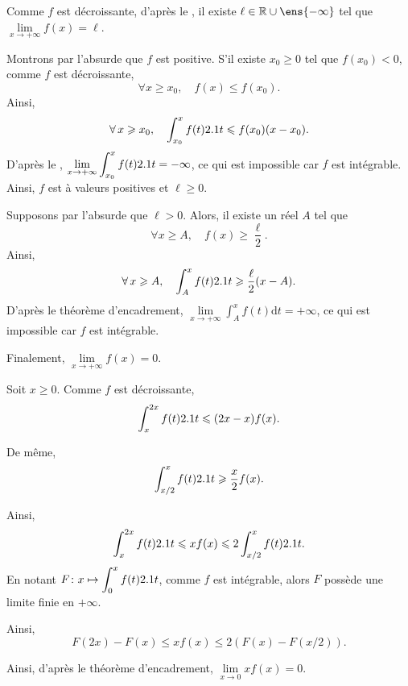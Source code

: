 \begin{elemsolution}
\begin{reponses}
\item Comme $f$ est décroissante, d'après le , il existe $\ell \in \R \cup \ens{-\infty}$ tel que $\lim\limits_{x\to+\infty} f(x) = \ell$.

\item Montrons par l'absurde que $f$ est positive. S'il existe $x_0 \geqslant 0$ tel que $f(x_0) < 0$, comme $f$ est décroissante,
\[
\forall x \geqslant x_0,\quad f(x) \leqslant f(x_0).
\]
Ainsi,
\[
\forall x \geqslant x_0,\quad \displaystyle\int_{x_0}^x f(t) \d t \leqslant f(x_0) (x - x_0).
\]
D'après le , $\lim\limits_{x\to+\infty} \displaystyle\int_{x_0}^x f(t) \d t = -\infty$, ce qui est impossible car $f$ est intégrable. Ainsi, $f$ est à valeurs positives et $\ell \geqslant 0$.

\begin{marginfigure}[0cm]
    \centering
    
    \caption{}
\end{marginfigure}

\item Supposons par l'absurde que $\ell > 0$. Alors, il existe un réel $A$ tel que
\[
\forall x \geqslant A,\quad f(x) \geqslant \frac{\ell}{2}.
\]
Ainsi,
\[
\forall x \geqslant A,\quad \displaystyle\int_A^x f(t) \d t \geqslant \frac{\ell}{2} (x - A).
\]
D'après le théorème d'encadrement, $\lim\limits_{x\to+\infty} \displaystyle\int_A^x f(t) \mathrm{d}t = +\infty$, ce qui est impossible car $f$ est intégrable.

Finalement, $\lim\limits_{x\to+\infty} f(x) = 0$.

\item Soit $x \geqslant 0$. Comme $f$ est décroissante,
\[
\int_x^{2 x} f(t) \d t \leqslant (2 x - x) f(x).
\]

De même,
\[
\int_{x/2}^x f(t) \d t \geqslant \frac{x}{2} f(x).
\]

\begin{marginfigure}
    \centering
    
    \caption{}
\end{marginfigure}

Ainsi,
\[
\int_x^{2 x} f(t) \d t \leqslant x f(x) \leqslant 2 \int_{x/2}^x f(t) \d t.
\]
En notant $\fonctionligne[F]{x}{\displaystyle\int_0^x f(t) \d t}$, comme $f$ est intégrable, alors $F$ possède une limite finie en $+\infty$.

Ainsi,
\[
F(2 x) - F(x) \leqslant x f(x) \leqslant 2 (F(x) - F(x/2)).
\]

Ainsi, d'après le théorème d'encadrement, $\lim\limits_{x\to 0} x f(x) = 0$.
\end{reponses}
\end{elemsolution}

